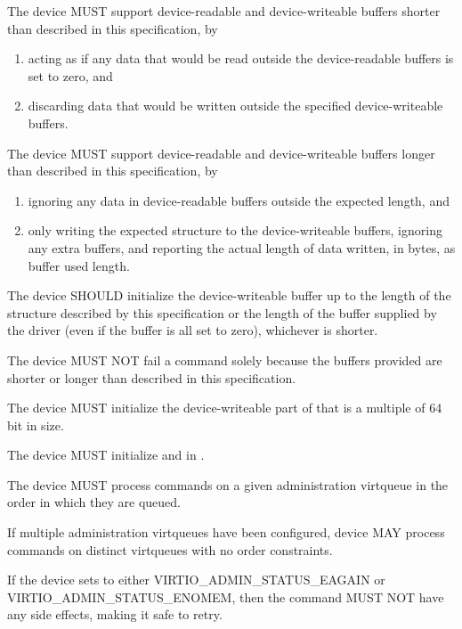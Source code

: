 The device MUST support device-readable and device-writeable buffers
shorter than described in this specification, by
\begin{enumerate}
\item acting as if any data that would be read outside the
device-readable buffers is set to zero, and
\item discarding data that would be written outside the
specified device-writeable buffers.
\end{enumerate}

The device MUST support device-readable and device-writeable buffers
longer than described in this specification, by
\begin{enumerate}
\item ignoring any data in device-readable buffers outside
the expected length, and
\item only writing the expected structure to the device-writeable
buffers, ignoring any extra buffers, and reporting the
actual length of data written, in bytes,
as buffer used length.
\end{enumerate}

The device SHOULD initialize the device-writeable buffer
up to the length of the structure described by this specification or
the length of the buffer supplied by the driver (even if the buffer is
all set to zero), whichever is shorter.

The device MUST NOT fail a command solely because the buffers
provided are shorter or longer than described in this
specification.

The device MUST initialize the device-writeable part of
 that is a multiple of 64 bit in
size.

The device MUST initialize  and
 in .

The device MUST process commands on a given administration virtqueue
in the order in which they are queued.

If multiple administration virtqueues have been configured,
device MAY process commands on distinct virtqueues with
no order constraints.

If the device sets  to either VIRTIO_ADMIN_STATUS_EAGAIN
or VIRTIO_ADMIN_STATUS_ENOMEM, then the command MUST NOT
have any side effects, making it safe to retry.


